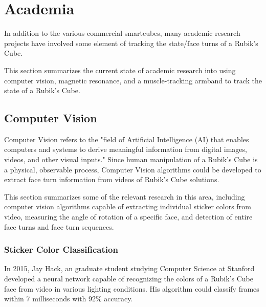 \section{Academia}
In addition to the various commercial smartcubes, many academic research projects have involved some element of tracking the state/face turns of a Rubik's Cube.

This section summarizes the current state of academic research into using computer vision, magnetic resonance, and a muscle-tracking armband to track the state of a Rubik's Cube.


\subsection{Computer Vision}
\label{subsec:computer-vision}
Computer Vision refers to the "field of Artificial Intelligence (AI) that enables computers and systems to derive meaningful information from digital images, videos, and other visual inputs." \cite{ibm-cv-definition}
Since human manipulation of a Rubik's Cube is a physical, observable process, Computer Vision algorithms could be developed to extract face turn information from videos of Rubik's Cube solutions.

This section summarizes some of the relevant research in this area, including computer vision algorithms capable of extracting individual sticker colors from video, measuring the angle of rotation of a specific face, and detection of entire face turns and face turn sequences.

\subsubsection{Sticker Color Classification}
In 2015, Jay Hack, an graduate student studying Computer Science at Stanford developed a neural network capable of recognizing the colors of a Rubik's Cube face from video in various lighting conditions.
His algorithm could classify frames within 7 milliseconds with 92\% accuracy. \cite{hackrubik}

